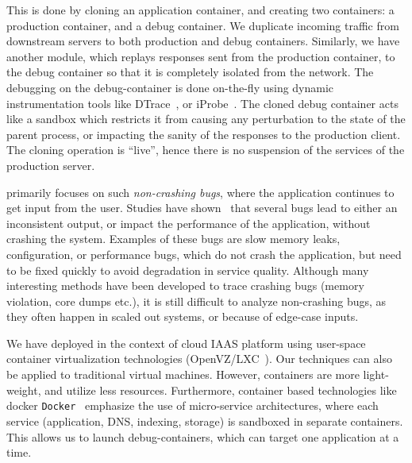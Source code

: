 This is done by cloning an application container, and creating two containers: a production container, and a debug container.
We duplicate incoming traffic from downstream servers to both production and debug containers.
Similarly, we have another module, which replays responses sent from the production container, to the debug container so that it is completely isolated from the network.
The debugging on the debug-container is done on-the-fly using dynamic instrumentation tools like DTrace~\cite{dtrace}, or iProbe~\cite{iprobe}.
The cloned debug container acts like a sandbox which restricts it from causing any perturbation to the state of the parent process, or impacting the sanity of the responses to the production client.
The cloning operation is ``live'', hence there is no suspension of the services of the production server.

\parikshan primarily focuses on such \emph{non-crashing bugs}, where the application continues to get input from the user.
Studies have shown~\cite{Zhang:2013:ADS:2486788.2486830, liu2005mining, kremenek2007factor} that several bugs lead to either an inconsistent output, or impact the performance of the application, without crashing the system.
Examples of these bugs are slow memory leaks, configuration, or performance bugs, which do not crash the application, but need to be fixed quickly to avoid degradation in service quality.
Although many interesting methods have been developed to trace crashing bugs (memory violation, core dumps etc.), it is still difficult to analyze non-crashing bugs, as they often happen in scaled out systems, or because of edge-case inputs.

We have deployed \parikshan in the context of cloud IAAS platform using user-space container virtualization technologies (OpenVZ/LXC~\cite{openvz,lxc}).
Our techniques can also be applied to traditional virtual machines.
However, containers are more light-weight, and utilize less resources.
Furthermore, container based technologies like docker \texttt{Docker}~\cite{docker} emphasize the use of micro-service architectures, where each service (application, DNS, indexing, storage) is sandboxed in separate containers.
This allows us to launch debug-containers, which can target one application at a time.

